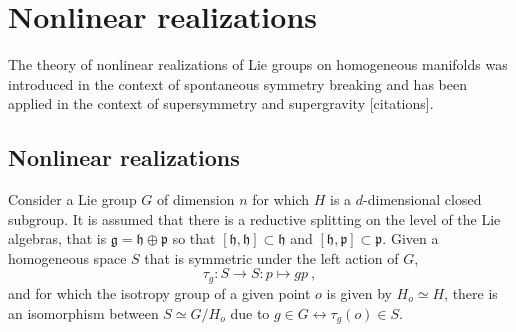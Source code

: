 \documentclass[11pt]{article}
\begin{document}
\section{Nonlinear realizations}

The theory of nonlinear realizations of Lie groups on homogeneous 
manifolds was introduced in the context of spontaneous symmetry 
breaking \cite{Coleman:1969sm,Callan:1969sn,Volkov:1973vd} and 
has been applied in the context of supersymmetry and supergravity 
[citations]. 


\subsection{Nonlinear realizations}

Consider a Lie group $G$ of dimension $n$ for which $H$ is a 
$d$-dimensional closed subgroup. It is assumed that there is a 
reductive splitting on the level of the Lie algebras, that is 
$\mathfrak{g} = \mathfrak{h} \oplus \mathfrak{p}$ so that 
$[\mathfrak{h},\mathfrak{h}] \subset \mathfrak{h}$ and 
$[\mathfrak{h},\mathfrak{p}] \subset \mathfrak{p}$. Given a 
homogeneous space $S$ that is symmetric under the left action of 
$G$,
\begin{equation}
	\tau_g : S \to S : p \mapsto gp~,
\end{equation}
and for which the isotropy group of a given point $o$ is given by 
$H_o \simeq H$, there is an isomorphism between $S \simeq G/H_o$ 
due to $g \in G \leftrightarrow \tau_g(o) \in S$.
\end{document}
